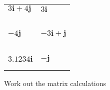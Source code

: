 \documentclass[fontsize=20pt]{scrartcl}
\begin{document}
\begin{tabular}{p{13cm}p{13cm}}
$3\mathbf{i}+4\mathbf{j}$
&$3\mathbf{i}$
\\\\\\
\\\\\\

$-4\mathbf{j}$
&$-3\mathbf{i}+\mathbf{j}$
\\\\\\
\\\\\\

$3.1234\mathbf{i}$
&$-\mathbf{j}$
\\\\\\
\end{tabular}
\newpage
Work out the matrix calculations
\newline
\newline
\end{document}

